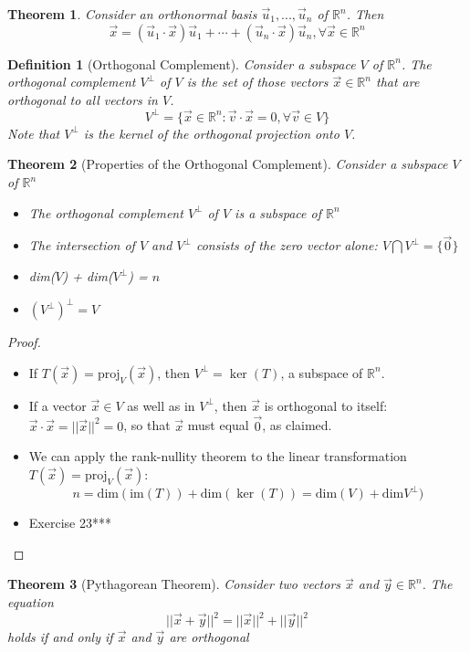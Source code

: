 \documentclass[10pt]{report}
\newtheorem{thm2}{Theorem}[section]
\newtheorem{def2}{Definition}[section]
\begin{document}
\begin{thm2}Consider an orthonormal basis $\vec{u}_1, ..., \vec{u}_n$ of $\mathbb{R}^n$. Then
$$\vec{x} = (\vec{u}_1\cdot \vec{x}) \vec{u}_1 + \cdots + (\vec{u}_n \cdot \vec{x})\vec{u}_n, \forall \vec{x}\in \mathbb{R}^n$$
\end{thm2}
\begin{def2}[Orthogonal Complement]
Consider a subspace $V$ of $\mathbb{R}^n$. The orthogonal complement $V^\perp$ of $V$ is the set of those vectors $\vec{x}\in \mathbb{R}^n$ that are orthogonal to all vectors in $V$.
$$V^\perp = \{\vec{x} \in \mathbb{R}^n: \vec{v}\cdot \vec{x} = 0, \forall \vec{v} \in V\}$$
Note that $V^\perp$ is the kernel of the orthogonal projection onto $V$.
\end{def2}
\begin{thm2}[Properties of the Orthogonal Complement]
Consider a subspace $V$ of $\mathbb{R}^n$
\begin{itemize}
\item[a.] The orthogonal complement $V^\perp$ of $V$ is a subspace of $\mathbb{R}^n$
\item[b.] The intersection of $V$ and $V^\perp$ consists of the zero vector alone: $V\bigcap V^\perp = \{\vec{0} \}$
\item[c.] dim($V$) + dim($V^\perp$) = $n$
\item[d.] $(V^\perp)^\perp = V$
\end{itemize}
\end{thm2}
\begin{proof}
\begin{itemize}
\item[a.] If $T(\vec{x})= \text{proj}_V(\vec{x})$, then $V^\perp=\ker(T)$, a subspace of $\mathbb{R}^n$.
\item[b.] If a vector $\vec{x}\in V$ as well as in $V^\perp$, then $\vec{x}$ is orthogonal to itself: $\vec{x}\cdot \vec{x}= ||\vec{x}||^2=0$, so that $\vec{x}$ must equal $\vec{0}$, as claimed.
\item[c.] We can apply the rank-nullity theorem to the linear transformation $T(\vec{x})=\text{proj}_V(\vec{x})$:
$$n=\text{dim}(\text{im}(T))+\text{dim}(\ker(T))=\text{dim}(V)+\text{dim}V^\perp)$$
\item[d.]Exercise 23***
\end{itemize}
\end{proof}
\begin{thm2}[Pythagorean Theorem]Consider two vectors $\vec{x}$ and $\vec{y}\in \mathbb{R}^n$. The equation
$$||\vec{x}+\vec{y}||^2 = ||\vec{x}||^2 + ||\vec{y}||^2$$
holds if and only if $\vec{x}$ and $\vec{y}$ are orthogonal
\end{thm2}
\end{document}
